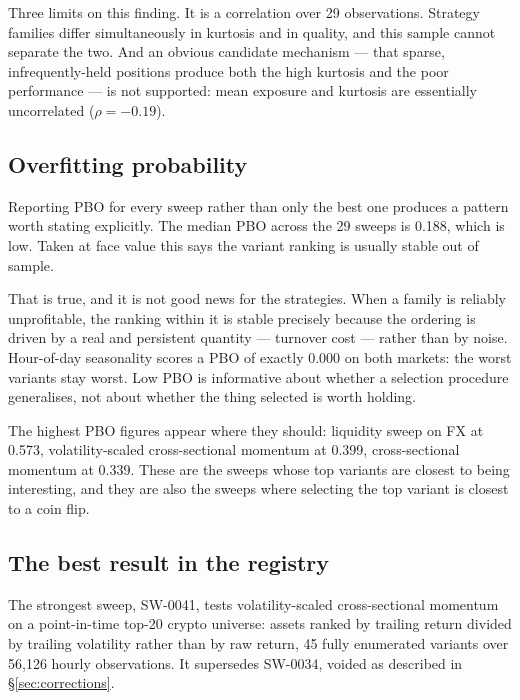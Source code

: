 \documentclass[11pt,a4paper]{article}
\begin{document}
Three limits on this finding. It is a correlation over 29 observations.
Strategy families differ simultaneously in kurtosis and in quality, and this
sample cannot separate the two. And an obvious candidate mechanism --- that
sparse, infrequently-held positions produce both the high kurtosis and the
poor performance --- is not supported: mean exposure and kurtosis are
essentially uncorrelated ($\rho = -0.19$).

\subsection{Overfitting probability}

Reporting PBO for every sweep rather than only the best one produces a
pattern worth stating explicitly. The median PBO across the 29 sweeps is
0.188, which is low. Taken at face value this says the variant ranking is
usually stable out of sample.

That is true, and it is not good news for the strategies. When a family is
reliably unprofitable, the ranking within it is stable precisely because the
ordering is driven by a real and persistent quantity --- turnover cost ---
rather than by noise. Hour-of-day seasonality scores a PBO of exactly 0.000
on both markets: the worst variants stay worst. Low PBO is informative about
whether a selection procedure generalises, not about whether the thing
selected is worth holding.

The highest PBO figures appear where they should: liquidity sweep on FX at
0.573, volatility-scaled cross-sectional momentum at 0.399, cross-sectional
momentum at 0.339. These are the sweeps whose top variants are closest to
being interesting, and they are also the sweeps where selecting the top
variant is closest to a coin flip.

\subsection{The best result in the registry}
\label{sec:best}

The strongest sweep, SW-0041, tests volatility-scaled cross-sectional
momentum on a point-in-time top-20 crypto universe: assets ranked by trailing
return divided by trailing volatility rather than by raw return, 45 fully
enumerated variants over 56{,}126 hourly observations. It supersedes SW-0034,
voided as described in \S\ref{sec:corrections}.
\end{document}
